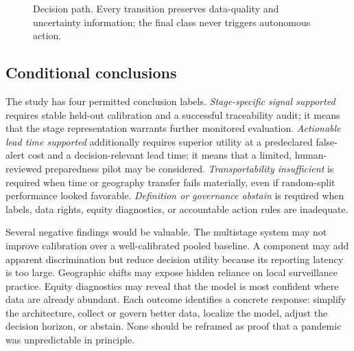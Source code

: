 \documentclass[conference]{IEEEtran}
\begin{document}
\begin{figure}[t]
\centering
{}
\caption{Decision path. Every transition preserves data-quality and uncertainty information; the final class never triggers autonomous action.}
\label{fig:decisionpath}
\end{figure}

\subsection{Conditional conclusions}

The study has four permitted conclusion labels. \emph{Stage-specific signal supported} requires stable held-out calibration and a successful traceability audit; it means that the stage representation warrants further monitored evaluation. \emph{Actionable lead time supported} additionally requires superior utility at a predeclared false-alert cost and a decision-relevant lead time; it means that a limited, human-reviewed preparedness pilot may be considered. \emph{Transportability insufficient} is required when time or geography transfer fails materially, even if random-split performance looked favorable. \emph{Definition or governance abstain} is required when labels, data rights, equity diagnostics, or accountable action rules are inadequate.

Several negative findings would be valuable. The multistage system may not improve calibration over a well-calibrated pooled baseline. A component may add apparent discrimination but reduce decision utility because its reporting latency is too large. Geographic shifts may expose hidden reliance on local surveillance practice. Equity diagnostics may reveal that the model is most confident where data are already abundant. Each outcome identifies a concrete response: simplify the architecture, collect or govern better data, localize the model, adjust the decision horizon, or abstain. None should be reframed as proof that a pandemic was unpredictable in principle.
\end{document}
